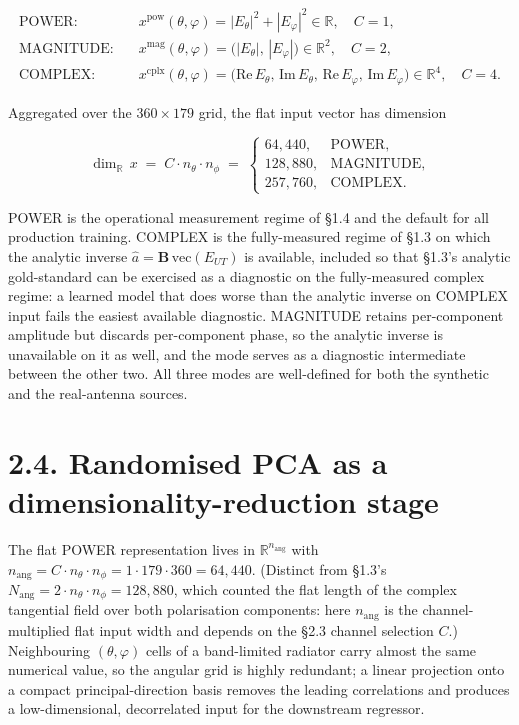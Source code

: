 \documentclass[
  english,
  11pt,
]{report}
\begin{document}
\[
\begin{aligned}
\text{POWER:}\quad &x^\mathrm{pow}(\theta,\varphi) = |E_\theta|^2 + |E_\varphi|^2 \in \mathbb{R}, \quad C = 1,\\
\text{MAGNITUDE:}\quad &x^\mathrm{mag}(\theta,\varphi) = \bigl(|E_\theta|,\,|E_\varphi|\bigr) \in \mathbb{R}^2, \quad C = 2,\\
\text{COMPLEX:}\quad &x^\mathrm{cplx}(\theta,\varphi) = \bigl(\mathrm{Re}\,E_\theta,\,\mathrm{Im}\,E_\theta,\,\mathrm{Re}\,E_\varphi,\,\mathrm{Im}\,E_\varphi\bigr) \in \mathbb{R}^4, \quad C = 4.
\end{aligned}
\]

Aggregated over the \(360 \times 179\) grid, the flat input vector has
dimension

\[
\dim_\mathbb R\,x \;=\; C\cdot n_\theta\cdot n_\phi\;=\; \begin{cases} 64{,}440, & \text{POWER},\\ 128{,}880, & \text{MAGNITUDE},\\ 257{,}760, & \text{COMPLEX}.\end{cases}
\]

POWER is the operational measurement regime of §1.4 and the default for
all production training. COMPLEX is the fully-measured regime of §1.3 on
which the analytic inverse \(\hat a = \mathbf B\,\mathrm{vec}(E_{UT})\)
is available, included so that §1.3's analytic gold-standard can be
exercised as a diagnostic on the fully-measured complex regime: a
learned model that does worse than the analytic inverse on COMPLEX input
fails the easiest available diagnostic. MAGNITUDE retains per-component
amplitude but discards per-component phase, so the analytic inverse is
unavailable on it as well, and the mode serves as a diagnostic
intermediate between the other two. All three modes are well-defined for
both the synthetic and the real-antenna sources.

\section{2.4. Randomised PCA as a dimensionality-reduction
stage}\label{randomised-pca-as-a-dimensionality-reduction-stage}

The flat POWER representation lives in \(\mathbb{R}^{n_\mathrm{ang}}\)
with
\(n_\mathrm{ang} = C\cdot n_\theta\cdot n_\phi = 1\cdot 179\cdot 360 = 64{,}440\).
(Distinct from §1.3's
\(N_\mathrm{ang} = 2\cdot n_\theta\cdot n_\phi = 128{,}880\), which
counted the flat length of the complex tangential field over both
polarisation components: here \(n_\mathrm{ang}\) is the
channel-multiplied flat input width and depends on the §2.3 channel
selection \(C\).) Neighbouring \((\theta, \varphi)\) cells of a
band-limited radiator carry almost the same numerical value, so the
angular grid is highly redundant; a linear projection onto a compact
principal-direction basis removes the leading correlations and produces
a low-dimensional, decorrelated input for the downstream regressor.
\end{document}
